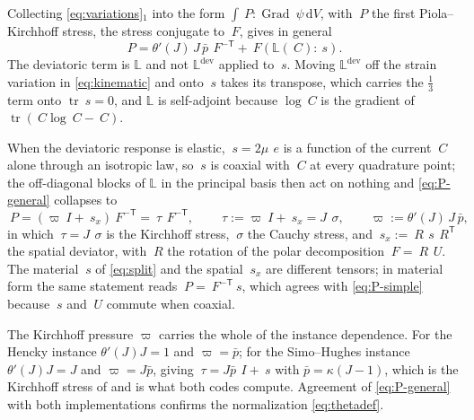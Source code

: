 \documentclass{article}
\newcommand{\F}{~F}
\newcommand{\C}{~C}
\newcommand{\Id}{~I}
\renewcommand{\P}{~P}
\newcommand{\edev}{~e}
\newcommand{\sdev}{~s}
\newcommand{\sdevx}{~s_{\!x}}
\newcommand{\btau}{~\tau}
\newcommand{\testd}{~\psi}
\newcommand{\Grad}{\operatorname{Grad}}
\newcommand{\trace}{\operatorname{tr}}
\newcommand{\transpose}[1]{#1^{\mathsf{T}}}
\newcommand{\diff}{\,\mathrm{d}}
\newcommand{\supdev}{^{\mathrm{dev}}}
\theoremstyle{definition}
\theoremstyle{plain}
\begin{document}
Collecting \eqref{eq:variations}$_1$ into the form $\int \P : \Grad\testd
\diff V$, with $\P$ the first Piola--Kirchhoff stress, the stress conjugate to
$\F$, gives in general
\begin{equation}
  \label{eq:P-general}
  \P = \theta'(J)\, J\, \bar p\, \F^{-\mathsf{T}}
     + \F \left( \mathbb{L}(\C) : \sdev \right).
\end{equation}
The deviatoric term is $\mathbb{L}$ and not $\mathbb{L}\supdev$ applied to
$\sdev$. Moving $\mathbb{L}\supdev$ off the strain variation in
\eqref{eq:kinematic} and onto $\sdev$ takes its transpose, which carries the
$\tfrac13$ term onto $\trace\sdev = 0$, and $\mathbb{L}$ is self-adjoint
because $\log\C$ is the gradient of $\trace(\C\log\C - \C)$.

When the deviatoric response is elastic, $\sdev = 2\mu\,\edev$ is a
function of the current $\C$ alone through an isotropic law, so $\sdev$ is
coaxial with $\C$ at every quadrature point; the off-diagonal blocks of
$\mathbb{L}$ in the principal basis then act on nothing and
\eqref{eq:P-general} collapses to
\begin{equation}
  \label{eq:P-simple}
  \P = \left( \varpi \Id + \sdevx \right) \F^{-\mathsf{T}} = \btau \, \F^{-\mathsf{T}},
  \qquad
  \btau := \varpi \Id + \sdevx = J\,~\sigma,
  \qquad
  \varpi := \theta'(J)\, J\, \bar p ,
\end{equation}
in which $\btau = J\,~\sigma$ is the Kirchhoff stress, $~\sigma$ the Cauchy
stress, and $\sdevx := ~R\,\sdev\,\transpose{~R}$ the spatial deviator, with
$~R$ the rotation of the polar decomposition $\F = ~R\,~U$. The material
$\sdev$ of \eqref{eq:split} and the spatial $\sdevx$ are different tensors; in
material form
the same statement reads $\P = \F^{-\mathsf T}\sdev$, which agrees with
\eqref{eq:P-simple} because $\sdev$ and $~U$ commute when coaxial.

The Kirchhoff pressure $\varpi$ carries the whole of the instance dependence.
For the Hencky instance $\theta'(J)J = 1$ and $\varpi = \bar p$; for the
Simo--Hughes instance $\theta'(J)J = J$ and $\varpi = J\bar p$, giving
$\btau = J\bar p\,\Id + \sdev$ with $\bar p = \kappa(J-1)$, which is the
Kirchhoff stress of \textcite[BOX 9.1]{SimoHughes:1998} and is what both codes
compute. Agreement of \eqref{eq:P-general} with both implementations confirms
the normalization \eqref{eq:thetadef}.
\end{document}
